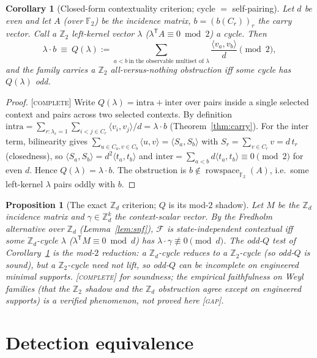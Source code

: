 \documentclass[11pt]{article}
\newtheorem{proposition}[theorem]{Proposition}
\newtheorem{corollary}[theorem]{Corollary}
\theoremstyle{definition}
\theoremstyle{remark}
\newcommand{\Z}{\mathbb{Z}}
\newcommand{\F}{\mathbb{F}}
\newcommand{\Zd}{\Z_d}
\newcommand{\ip}[2]{\langle #1,#2\rangle}
\DeclareMathOperator{\rowspace}{rowspace}
\newcommand{\CO}{\textnormal{\textsc{[complete]}}}
\newcommand{\GAP}{\textnormal{\textsc{[gap]}}}
\begin{document}
\begin{corollary}[Closed-form contextuality criterion; cycle $=$ self-pairing]\label{cor:cycle}
Let $d$ be even and let $A$ (over $\F_2$) be the incidence matrix, $b=(b(C_r))_r$ the carry vector.
Call a $\Z_2$ left-kernel vector $\lambda$ ($\lambda^{\mathsf T}A\equiv0\bmod2$) a \emph{cycle}. Then
\[
\lambda\cdot b\ \equiv\ Q(\lambda):=\!\!\sum_{a<b\ \text{in the observable multiset of }\lambda}
\!\!\frac{\ip{v_a}{v_b}}{d}\pmod2 ,
\]
and the family carries a $\Z_2$ all-versus-nothing obstruction iff some cycle has $Q(\lambda)$ odd.
\end{corollary}
\begin{proof}
\CO{} Write $Q(\lambda)=\text{intra}+\text{inter}$ over pairs inside a single selected context and
pairs across two selected contexts. By definition $\text{intra}=\sum_{r:\lambda_r=1}\sum_{i<j\in
C_r}\ip{v_i}{v_j}/d=\lambda\cdot b$ (Theorem~\ref{thm:carry}). For the inter term, bilinearity gives
$\sum_{u\in C_a,v\in C_b}\ip{u}{v}=\ip{S_a}{S_b}$ with $S_r=\sum_{v\in C_r}v=d\,t_r$ (closedness),
so $\ip{S_a}{S_b}=d^2\ip{t_a}{t_b}$ and $\text{inter}=\sum_{a<b}d\ip{t_a}{t_b}\equiv0\pmod2$ for even
$d$. Hence $Q(\lambda)=\lambda\cdot b$. The obstruction is $b\notin\rowspace_{\F_2}(A)$, i.e.\ some
left-kernel $\lambda$ pairs oddly with $b$.
\end{proof}

\begin{proposition}[The exact $\Zd$ criterion; $Q$ is its mod-$2$ shadow]\label{prop:zd}
Let $M$ be the $\Zd$ incidence matrix and $\gamma\in\Zd^{k}$ the context-scalar vector. By the
Fredholm alternative over $\Zd$ (Lemma~\ref{lem:snf}), $\mathcal F$ is state-independent contextual
iff some $\Zd$-cycle $\lambda$ ($\lambda^{\mathsf T}M\equiv0\bmod d$) has
$\lambda\cdot\gamma\not\equiv0\pmod d$. The odd-$Q$ test of Corollary~\ref{cor:cycle} is the mod-$2$
reduction: a $\Zd$-cycle reduces to a $\Z_2$-cycle (so odd-$Q$ is \emph{sound}), but a $\Z_2$-cycle
need not lift, so odd-$Q$ can be \emph{incomplete} on engineered minimal supports.
\CO{} for soundness; the empirical faithfulness on \emph{Weyl} families (that the $\Z_2$ shadow and
the $\Zd$ obstruction agree except on engineered supports) is a verified phenomenon, not proved here
\GAP.
\end{proposition}

\section{Detection equivalence}\label{sec:detect}
\end{document}
